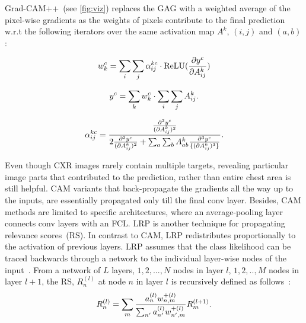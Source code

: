\documentclass[conference]{IEEEtran}
\begin{document}
Grad-CAM++~(see \cref{fig:viz}) replaces the GAG with a weighted average of the pixel-wise gradients as the weights of pixels contribute to the final prediction w.r.t the following iterators over the same activation map $A^k$, $(i,j)$ and $(a,b)$: 

\vspace{-2mm}
\begin{equation}
\scriptsize{
    w_k^c=\sum_{i}\sum_{j}\alpha_{ij}^{kc}\cdot \operatorname{ReLU}(\frac{\partial y^c}{\partial A_{ij}^k})}
\end{equation}
\vspace{-2mm}

\begin{equation}
\scriptsize{
    y^c=\sum_{k}w_k^c\cdot \sum_{i}\sum_{j}A_{ij}^k.} 
\end{equation}
\vspace{-4mm}

\begin{equation}
\scriptsize{
    \alpha_{ij}^{kc}=\frac{\frac{\partial^2y^c}{(\partial A_{ij}^k)^2}}{2\frac{\partial^2y^c}{(\partial A_{ij}^k)^2}+\sum_{a}\sum_{b}A_{ab}^k{\frac{\partial^3y^c}{\{(\partial A_{ij}^k)^3\}}}}.}
    \label{eq:w}
\end{equation}
\vspace{-2mm}

Even though CXR images rarely contain multiple targets, revealing particular image parts that contributed to the prediction, rather than entire chest area is still helpful. CAM variants that back-propagate the gradients all the way up to the inputs, are essentially propagated only till the final conv layer. Besides, CAM methods are limited to specific architectures, where an average-pooling layer connects conv layers with an FCL. LRP is another technique for propagating relevance scores~(RS). In contrast to CAM, LRP redistributes proportionally to the activation of previous layers. LRP assumes that the class likelihood can be traced backwards through a network to the individual layer-wise nodes of the input~\cite{LRP2}. From a network of $L$ layers, $1,2,...,N$ nodes in layer $l$, $1,2,..,M$ nodes in layer $l+1$, the RS, $R_{n}^{(l)}$ at node $n$ in layer $l$ is recursively defined as follows~\cite{LRP2}:   
\begin{equation}
\scriptsize{
    R_{n}^{(l)}=\sum_{m} \frac{a_{n}^{(l)} w_{n, m}^{+(l)}}{\sum_{n^{\prime}} a_{n^{\prime}}^{(l)} w_{n^{\prime}, m}^{+(l)}} R_{m}^{(l+1)}.}
\end{equation}
\vspace{-2mm}
\end{document}
